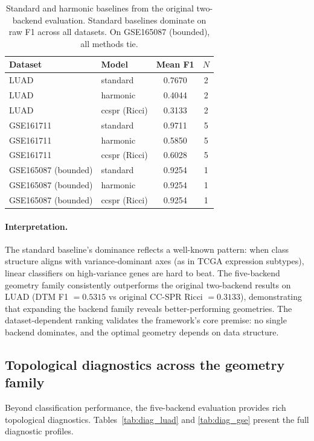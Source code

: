 \documentclass[11pt]{article}
\begin{document}
\begin{table}[h]
\centering
\small
\begin{tabular}{llcc}
\toprule
Dataset & Model & Mean F1 & $N$ \\
\midrule
LUAD & standard & 0.7670 & 2 \\
LUAD & harmonic & 0.4044 & 2 \\
LUAD & ccspr (Ricci) & 0.3133 & 2 \\
\midrule
GSE161711 & standard & 0.9711 & 5 \\
GSE161711 & harmonic & 0.5850 & 5 \\
GSE161711 & ccspr (Ricci) & 0.6028 & 5 \\
\midrule
GSE165087 (bounded) & standard & 0.9254 & 1 \\
GSE165087 (bounded) & harmonic & 0.9254 & 1 \\
GSE165087 (bounded) & ccspr (Ricci) & 0.9254 & 1 \\
\bottomrule
\end{tabular}
\caption{Standard and harmonic baselines from the original two-backend evaluation.
Standard baselines dominate on raw F1 across all datasets.
On GSE165087 (bounded), all methods tie.}
\label{tab:baselines}
\end{table}

\paragraph{Interpretation.}
The standard baseline's dominance reflects a well-known pattern: when class structure aligns with variance-dominant axes (as in TCGA expression subtypes), linear classifiers on high-variance genes are hard to beat.
The five-backend geometry family consistently outperforms the original two-backend results on LUAD (DTM F1 $= 0.5315$ vs original CC-SPR Ricci $= 0.3133$), demonstrating that expanding the backend family reveals better-performing geometries.
The dataset-dependent ranking validates the framework's core premise: no single backend dominates, and the optimal geometry depends on data structure.

\subsection{Topological diagnostics across the geometry family}

Beyond classification performance, the five-backend evaluation provides rich topological diagnostics.
Tables~\ref{tab:diag_luad} and \ref{tab:diag_gse} present the full diagnostic profiles.
\end{document}
